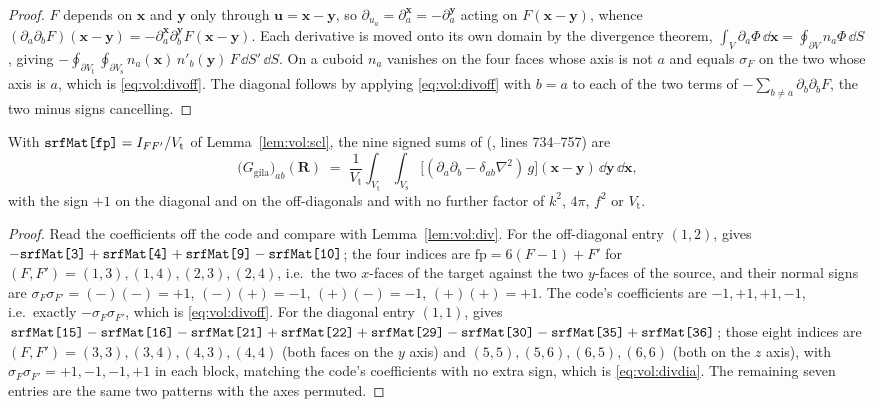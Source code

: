 \begin{proof}
$F$ depends on $\mathbf{x}$ and $\mathbf{y}$ only through $\mathbf{u} =
\mathbf{x}-\mathbf{y}$, so $\partial_{u_a} = \partial^{\mathbf{x}}_a =
-\partial^{\mathbf{y}}_a$ acting on $F(\mathbf{x}-\mathbf{y})$, whence
$(\partial_a\partial_b F)(\mathbf{x}-\mathbf{y}) = -\partial^{\mathbf{x}}_a
\partial^{\mathbf{y}}_b F(\mathbf{x}-\mathbf{y})$. Each derivative is moved onto its own
domain by the divergence theorem, $\int_{V}\partial_a\Phi\,\dd\mathbf{x} =
\oint_{\partial V} n_a \Phi\,\dd S$, giving
$-\oint_{\partial V_{\mathrm{t}}}\oint_{\partial V_{\mathrm{s}}}
n_a(\mathbf{x})\,n'_b(\mathbf{y})\,F\,\dd S'\,\dd S$. On a cuboid $n_a$ vanishes on the
four faces whose axis is not $a$ and equals $\sigma_F$ on the two whose axis is $a$, which
is \eqref{eq:vol:divoff}. The diagonal follows by applying \eqref{eq:vol:divoff} with
$b = a$ to each of the two terms of
$-\sum_{b\neq a}\partial_b\partial_b F$, the two minus signs cancelling.
\end{proof}

\begin{proposition}
\label{prop:vol:srfsum}
With $\texttt{srfMat[fp]} = I_{FF'}/V_{\mathrm{t}}$ of Lemma~\ref{lem:vol:scl}, the nine
signed sums of  (, lines 734--757) are
\begin{equation}
\bigl(G_{\mathrm{gila}}\bigr)_{ab}(\mathbf{R})
\;=\; \frac{1}{V_{\mathrm{t}}}\int_{V_{\mathrm{t}}}\!\int_{V_{\mathrm{s}}}
\bigl[(\partial_a\partial_b - \delta_{ab}\nabla^2)\,g\bigr](\mathbf{x}-\mathbf{y})\,
\dd\mathbf{y}\,\dd\mathbf{x},
\label{eq:vol:srfsum}
\end{equation}
with the sign $+1$ on the diagonal and on the off-diagonals and with no further factor of
$k^2$, $4\pi$, $f^2$ or $V_{\mathrm{t}}$.
\end{proposition}

\begin{proof}
Read the coefficients off the code and compare with Lemma~\ref{lem:vol:div}. For the
off-diagonal entry $(1,2)$,  gives
$-\texttt{srfMat[3]}+\texttt{srfMat[4]}+\texttt{srfMat[9]}-\texttt{srfMat[10]}$; the four indices
are $\mathrm{fp} = 6(F-1)+F'$ for $(F,F') = (1,3),(1,4),(2,3),(2,4)$, i.e.\ the two
$x$-faces of the target against the two $y$-faces of the source, and their normal signs
are $\sigma_F\sigma_{F'} = (-)(-) = +1$, $(-)( +) = -1$, $(+)(-) = -1$, $(+)(+) = +1$. The
code's coefficients are $-1, +1, +1, -1$, i.e.\ exactly $-\sigma_F\sigma_{F'}$, which is
\eqref{eq:vol:divoff}. For the diagonal entry $(1,1)$,  gives
$\texttt{srfMat[15]}-\texttt{srfMat[16]}-\texttt{srfMat[21]}+\texttt{srfMat[22]}
+\texttt{srfMat[29]}-\texttt{srfMat[30]}-\texttt{srfMat[35]}+\texttt{srfMat[36]}$; those eight
indices are $(F,F') = (3,3),(3,4),(4,3),(4,4)$ (both faces on the $y$ axis) and
$(5,5),(5,6),(6,5),(6,6)$ (both on the $z$ axis), with
$\sigma_F\sigma_{F'} = +1,-1,-1,+1$ in each block, matching the code's coefficients with
no extra sign, which is \eqref{eq:vol:divdia}. The remaining seven entries are the same
two patterns with the axes permuted.
\end{proof}

